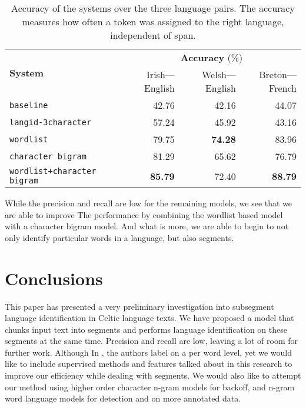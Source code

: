 \documentclass[11pt]{article}
\begin{document}
\begin{table}
\begin{center}
\begin{tabular}{|l|r|r|r|}
\hline
\multirow{2}{*}{\textbf{System}} &  \multicolumn{3}{c|}{\textbf{Accuracy} (\%)} \\\cline{2-4}
       &   Irish---English & Welsh---English & Breton---French \\ 
\hline
\texttt{baseline} & 42.76 & 42.16 & 44.07 \\
\hline
\texttt{langid-3character} & 57.24 & 45.92 & 43.16 \\
\hline
\texttt{wordlist} & 79.75 & \textbf{74.28} & 83.96 \\
\hline
\texttt{character bigram} & 81.29 & 65.62 & 76.79 \\
\hline
\texttt{wordlist+character bigram} & \textbf{85.79} & 72.40 & \textbf{88.79} \\
\hline
\end{tabular}
\end{center}
\caption{Accuracy of the systems over the three language pairs. The accuracy measures how often a token
  was assigned to the right language, independent of span.}
\label{table:accuracy}
\end{table}
While the precision and recall are low for the remaining models, we see that we are able to improve 
The performance by combining the wordlist based model with a character bigram model. And what is more, we are able to begin to not only 
identify particular words in a language, but also segments.

\vspace{-0.132cm}
\section{Conclusions}
\vspace{-0.132cm}
\label{sec:conclusions}

This paper has presented a very preliminary investigation into subsegment language identification in Celtic language texts. We have
proposed a model that chunks input text into segments and performs language identification on these segments at the same time. Precision and
recall are low, leaving a lot of room for further work.
 Although In \cite{king2013labeling}, the authors label on a per word level, yet we would like to include supervised methods and features talked about in this research to improve our efficiency while dealing with segments. We would also like to attempt our method using higher order character n-gram models for backoff, and n-gram word language models for detection and on more annotated data. 
\end{document}
